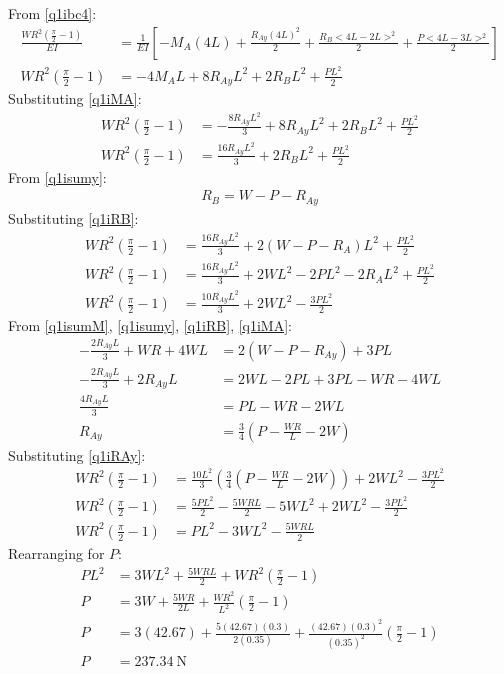 \documentclass[11pt]{article}
\numberwithin{equation}{section}
\begin{document}
From \ref{q1ibc4}:
\begin{align}
    \frac{WR^2\left(\frac{\pi}{2}-1\right)}{EI} &= \frac{1}{EI} \left[-M_A \left(4L\right) + \frac{R_{Ay}\left(4L\right)^2}{2} + \frac{R_B<4L-2L>^2}{2} + \frac{P<4L-3L>^2}{2}\right]\\
    WR^2\left(\frac{\pi}{2}-1\right) &= -4M_A L + 8R_{Ay}L^2 + 2R_BL^2 + \frac{PL^2}{2}
\end{align}
Substituting \ref{q1iMA}:
\begin{align}
    WR^2\left(\frac{\pi}{2}-1\right) &= -\frac{8R_{Ay}L^2}{3} + 8R_{Ay}L^2 + 2R_BL^2 + \frac{PL^2}{2}\\
    WR^2\left(\frac{\pi}{2}-1\right) &= \frac{16R_{Ay}L^2}{3} + 2R_BL^2 + \frac{PL^2}{2}
\end{align}
From \ref{q1isumy}:
\begin{align}
    R_B = W - P - R_{Ay} \label{q1iRB}
\end{align}
Substituting \ref{q1iRB}:
\begin{align}
    WR^2\left(\frac{\pi}{2}-1\right) &= \frac{16R_{Ay}L^2}{3} + 2\left(W - P - R_A\right)L^2 + \frac{PL^2}{2}\\
    WR^2\left(\frac{\pi}{2}-1\right) &= \frac{16R_{Ay}L^2}{3} + 2WL^2 - 2PL^2 - 2R_AL^2 + \frac{PL^2}{2}\\
    WR^2\left(\frac{\pi}{2}-1\right) &= \frac{10R_{Ay}L^2}{3} + 2WL^2 -\frac{3PL^2}{2}
\end{align}
From \ref{q1isumM}, \ref{q1isumy}, \ref{q1iRB}, \ref{q1iMA}: 
\begin{align}
    -\frac{2R_{Ay}L}{3} + WR + 4WL &= 2 \left(W - P - R_{Ay}\right) + 3PL\\
    -\frac{2R_{Ay}L}{3} + 2R_{Ay}L &= 2WL -2PL + 3PL -WR - 4WL\\
    \frac{4R_{Ay}L}{3} &= PL - WR -2WL\\
    R_{Ay} &= \frac{3}{4}\left(P - \frac{WR}{L} - 2W\right) \label{q1iRAy}
\end{align}
Substituting \ref{q1iRAy}:
\begin{align}
    WR^2\left(\frac{\pi}{2}-1\right) &= \frac{10L^2}{3}\left(\frac{3}{4}\left(P - \frac{WR}{L} - 2W\right)\right) + 2WL^2 - \frac{3PL^2}{2}\\
    WR^2\left(\frac{\pi}{2}-1\right) &= \frac{5PL^2}{2} - \frac{5WRL}{2} - 5WL^2 + 2WL^2 - \frac{3PL^2}{2}\\
    WR^2\left(\frac{\pi}{2}-1\right) &= PL^2 - 3WL^2 - \frac{5WRL}{2}
\end{align}
Rearranging for $P$:
\begin{align}
    PL^2 &= 3WL^2 + \frac{5WRL}{2} + WR^2 \left(\frac{\pi}{2}-1\right)\\
    P &= 3W + \frac{5WR}{2L} + \frac{WR^2}{L^2} \left(\frac{\pi}{2}-1\right)\\
    P &= 3(42.67) + \frac{5(42.67)(0.3)}{2(0.35)} + \frac{(42.67)(0.3)^2}{(0.35)^2} \left(\frac{\pi}{2}-1\right)\\
    P &= \SI{237.34}{\newton} \label{eq:q1i2}
\end{align}
\end{document}
